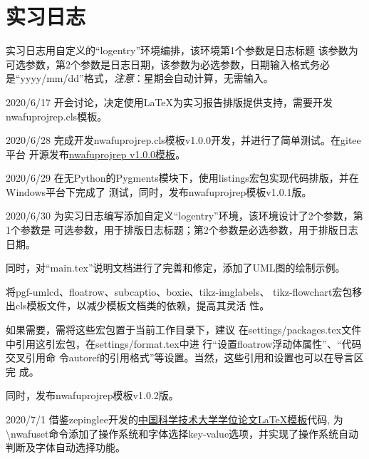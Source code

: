 \documentclass[
  ]{nwafuprojrep}
\begin{document}
\section{实习日志}
实习日志用自定义的\enquote{logentry}环境编排，该环境第1个参数是日志标题
该参数为可选参数，第2个参数是日志日期，该参数为必选参数，日期输入格式务必是\enquote{yyyy/mm/dd}格式，\emph{注意}：星期会自动计算，无需输入。
\begin{logentry}[会议讨论]{2020/6/17}
  开会讨论，决定使用\LaTeX{}为实习报告排版提供支持，需要开发
  {nwafuprojrep.cls}模板。
\end{logentry}
\begin{logentry}[完成开发]{2020/6/28}
  完成开发{nwafuprojrep.cls}模板v1.0.0开发，并进行了简单测试。在gitee平台
  开源发布\href{https://gitee.com/registor/nwafuprojrep}{nwafuprojrep v1.0.0模板}。  
\end{logentry}

\begin{logentry}[修正无Python的Pygments下代码排版问题]{2020/6/29}
  在无Python的Pygments模块下，使用listings宏包实现代码排版，并在Windows平台下完成了
  测试，同时，发布nwafuprojrep模板v1.0.1版。  
\end{logentry}

\begin{logentry}{2020/6/30}
  为实习日志编写添加自定义\enquote{logentry}环境，该环境设计了2个参数，第1个参数是
  可选参数，用于排版日志标题；第2个参数是必选参数，用于排版日志日期。  
  
  同时，对\enquote{main.tex}说明文档进行了完善和修定，添加了UML图的绘制示例。
  
  将pgf-umlcd、floatrow、subcaptio、boxie、tikz-imglabels、
  tikz-flowchart宏包移出cls模板文件，以减少模板文档类的依赖，提高其灵活
  性。
  
  如果需要，需将这些宏包置于当前工作目录下，建议
  在settings/packages.tex文件中引用这引宏包，在settings/format.tex中进
  行\enquote{设置floatrow浮动体属性}、\enquote{代码交叉引用命
    令autoref的引用格式}等设置。当然，这些引用和设置也可以在导言区完
  成。

  同时，发布nwafuprojrep模板v1.0.2版。
\end{logentry}

\begin{logentry}[添加操作系统及字体判断功能]{2020/7/1}
  借鉴zepinglee开发的\href{https://github.com/ustctug/ustcthesis}{中国科学技术大学学位论文\LaTeX{}模板}代码, 为\textbackslash{}nwafuset命令添加了操作系统和字体选择key-value选项，并实现了操作系统自动判断及字体自动选择功能。
\end{logentry}
\end{document}
